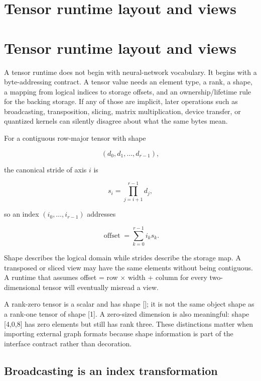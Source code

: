 \hypertarget{appendix-cebadf3106d1}{}
\section*{Tensor runtime layout and views}
\section{Tensor runtime layout and views}\label{appendix-cebadf3106d1-tensor-runtime-layout-and-views}

A tensor runtime does not begin with neural-network vocabulary. It begins with a byte-addressing contract. A tensor value needs an element type, a rank, a shape, a mapping from logical indices to storage offsets, and an ownership/lifetime rule for the backing storage. If any of those are implicit, later operations such as broadcasting, transposition, slicing, matrix multiplication, device transfer, or quantized kernels can silently disagree about what the same bytes mean.

For a contiguous row-major tensor with shape

\[
(d_0,d_1,\ldots,d_{r-1}),
\]

the canonical stride of axis \(i\) is

\[
s_i = \prod_{j=i+1}^{r-1} d_j,
\]

so an index \((i_0,\ldots,i_{r-1})\) addresses

\[
\operatorname{offset}=\sum_{k=0}^{r-1} i_k s_k.
\]

Shape describes the logical domain while strides describe the storage map. A transposed or sliced view may have the same elements without being contiguous. A runtime that assumes offset = row × width + column for every two-dimensional tensor will eventually misread a view.

A rank-zero tensor is a scalar and has shape {[}{]}; it is not the same object shape as a rank-one tensor of shape {[}1{]}. A zero-sized dimension is also meaningful: shape {[}4,0,8{]} has zero elements but still has rank three. These distinctions matter when importing external graph formats because shape information is part of the interface contract rather than decoration.

\subsection{Broadcasting is an index transformation}\label{appendix-cebadf3106d1-broadcasting-is-an-index-transformation}

